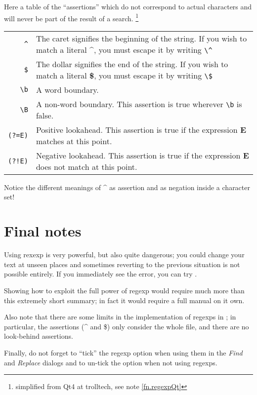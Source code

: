 Here a table of the ``assertions'' which do not correspond to actual characters and will never be part of the result of a search. \footnote{simplified from Qt4 at trolltech, see note \ref{fn.regexpQt}}
\smallskip

\noindent\begin{tabular}{Rp{113mm}}
\toprule
\verb|^| & The caret signifies the beginning of the string. If you wish to match a literal \textbf{\^{}}, you must escape it by writing \verb|\^|\\
\verb|$| & The dollar signifies the end of the string. If you wish to match a literal \textbf{\$}, you must escape it by writing \verb|\$|\\  
\verb|\b| & A word boundary.\\
\verb|\B| & A non-word boundary. This assertion is true wherever \verb|\b| is false.\\
\verb|(?=E)| & Positive lookahead. This assertion is true if the expression \textbf{E} matches at this point.\\
\verb|(?!E)| & Negative lookahead. This assertion is true if the expression \textbf{E} does not match at this point.\\
\bottomrule
\end{tabular}
\smallskip

Notice the different meanings of \textbf{\^{}} as assertion and as negation inside a character set!

\section{Final notes}

Using rexexp is very powerful, but also quite dangerous; you could change your text at unseen places and sometimes reverting to the previous situation is not possible entirely. If you immediately see the error, you can try .

Showing how to exploit the full power of regexp would require much more than this extremely short summary; in fact it would require a full manual on it own.

Also note that there are some limits in the implementation of regexps in {\Tw}; in particular, the assertions (\^{} and \$) only consider the whole file, and there are no look-behind assertions.

Finally, do not forget to ``tick'' the regexp option when using them in the \emph{Find} and \emph{Replace} dialogs and to un-tick the option when not using regexps.
